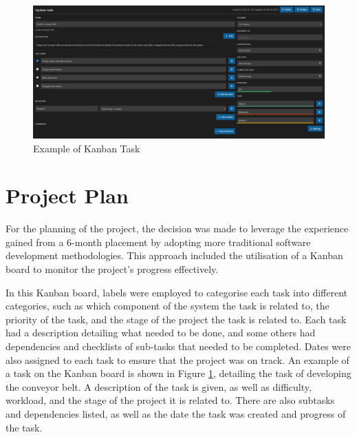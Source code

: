 \begin{figure}[t]
  \begin{minipage}[t]{\textwidth}
    \centering
    \includegraphics[width=\textwidth, height=\textheight, keepaspectratio]{imgs/appendix/taskexample.jpg}
    \caption{Example of Kanban Task}
    \label{fig:kantask}
  \end{minipage}
  \hfill 
\end{figure}

\section{Project Plan}
\label{sec:projectplan}
For the planning of the project, the decision was made to leverage the experience gained from a 6-month placement by adopting more traditional software development methodologies.
This approach included the utilisation of a Kanban board to monitor the project's progress effectively.

In this Kanban board, labels were employed to categorise each task into different categories, such as
which component of the system the task is related to, the priority of the task, and the stage of the project the task is related to.
Each task had a description detailing what needed to be done, and some others had dependencies and checklists of sub-tasks that needed to be completed.
Dates were also assigned to each task to ensure that the project was on track. An example of a task on the Kanban board is shown in Figure \ref{fig:kantask},
detailing the task of developing the conveyor belt. A description of the task is given, as well as difficulty, workload, and the stage of the project it is related to.
There are also subtasks and dependencies listed, as well as the date the task was created and progress of the task.

